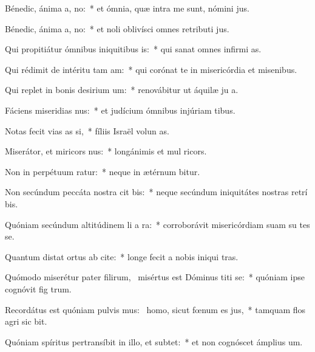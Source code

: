 \item Bénedic, ánima a, no:~* et ómnia, quæ intra me sunt, nómini  jus.
\item Bénedic, ánima a, no:~* et noli oblivísci omnes retributi jus.
\item Qui propitiátur ómnibus iniquitibus is:~* qui sanat omnes infirmi as.
\item Qui rédimit de intéritu tam am:~* qui corónat te in misericórdia et misenibus.
\item Qui replet in bonis desirium um:~* renovábitur ut áquilæ ju a.
\item Fáciens miseridias nus:~* et judícium ómnibus injúriam tibus.
\item Notas fecit vias as si,~* fíliis Israël volun as.
\item Miserátor, et miricors nus:~* longánimis et mul ricors.
\item Non in perpétuum ratur:~* neque in ætérnum bitur.
\item Non secúndum peccáta nostra cit bis:~* neque secúndum iniquitátes nostras retrí bis.
\item Quóniam secúndum altitúdinem li a ra:~* corroborávit misericórdiam suam su tes se.
\item Quantum distat ortus ab cite:~* longe fecit a nobis iniqui tras.
\item Quómodo miserétur pater filirum,~\pscross{} misértus est Dóminus titi se:~* quóniam ipse cognóvit fig trum.
\item Recordátus est quóniam pulvis mus:~\pscross{} homo, sicut fœnum es jus,~* tamquam flos agri sic bit.
\item Quóniam spíritus pertransíbit in illo, et  subtet:~* et non cognóscet ámplius  um.
